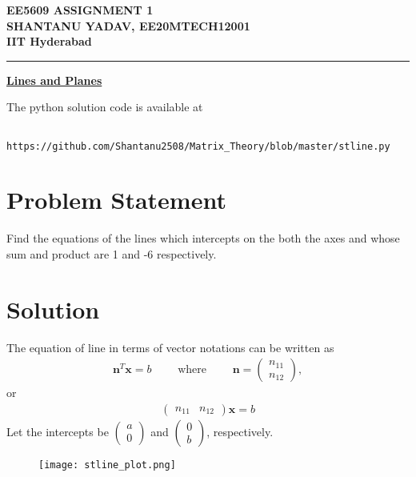\documentclass[12pt]{article}
\newcommand{\myvec}[1]{\ensuremath{\begin{pmatrix}#1\end{pmatrix}}}
\begin{document}
\begin{center}
	{\large \bf EE5609 ASSIGNMENT 1} \\
	\vspace{2ex}
	{\large \bf SHANTANU YADAV, EE20MTECH12001 }\\
	{\Large \bf IIT Hyderabad} \\ \vspace{2ex}
\end{center}
	\hrule

\vspace{2ex}
\begin{center}
{\underline{\Large \bf Lines and Planes}}
\end{center}

\noindent 
The python solution code is available at
\begin{lstlisting}
	https://github.com/Shantanu2508/Matrix_Theory/blob/master/stline.py
\end{lstlisting}

\section*{Problem Statement}
Find the equations of the lines which intercepts on the both the axes and whose sum and product are 1 and -6 respectively.

\section*{Solution}
The equation of line in terms of vector notations can be written as
\begin{align}
	{\mathbf{n}^T}{\mathbf x} = b     \qquad \text{ where } \qquad 
	\mathbf{n} = \myvec{n_{11} \\  n_{12}}, 
\end{align}
	or
\begin{align}
	\myvec{n_{11} &  n_{12}} \mathbf{x} = b	\label{eq2}
\end{align}
Let the intercepts be $\myvec{a \\ 0}$ and $\myvec{0 \\ b}$, respectively.

\begin{figure}[htbp]
\centering
\texttt{[image: stline\_plot.png]}
\caption{}
\end{figure}
\end{document}
